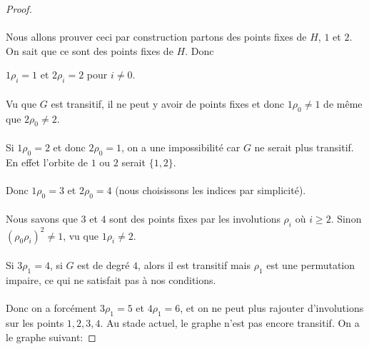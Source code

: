 \begin{proof}
  \item
  \paragraph{}
  Nous allons prouver ceci par construction partons des points fixes de $H$, $1$ et $2$. On sait que ce sont des points fixes de $H$. Donc
  \begin{center}
    $1 \rho_i = 1$ et $2 \rho_i = 2$ pour $i \neq 0$.
  \end{center}

  \paragraph{}
  Vu que $G$ est transitif, il ne peut y avoir de points fixes et donc $1 \rho_0 \neq 1$ de même que $2 \rho_0 \neq 2$.

  \paragraph{}
  Si $ 1 \rho_0 = 2$ et donc $2 \rho_0 = 1$, on a une impossibilité car $G$ ne serait plus transitif. En effet l'orbite de $1$ ou $2$ serait $\{1,2\}$.

  \paragraph{}
  Donc $1 \rho_0 = 3$ et $2 \rho_0 = 4$ (nous choisissons les indices par simplicité).

  \paragraph{}
  Nous savons que $3$ et $4$ sont des points fixes par les involutions $\rho_i$ où $i \ge 2$. Sinon $(\rho_0\rho_i)^2 \neq 1$, vu que $1 \rho_i \neq 2$.

  \paragraph{}
  Si $3 \rho_1  = 4$, si $G$ est de degré $4$, alors il est transitif mais $\rho_1$ est une permutation impaire, ce qui ne satisfait pas à nos conditions.

  \paragraph{}
  Donc on a forcément $3 \rho_1 = 5$ et $4 \rho_1 = 6$, et on ne peut plus rajouter d'involutions sur les points $1, 2, 3, 4$. Au stade actuel, le graphe n'est pas encore transitif. On a le graphe suivant:


\end{proof}
